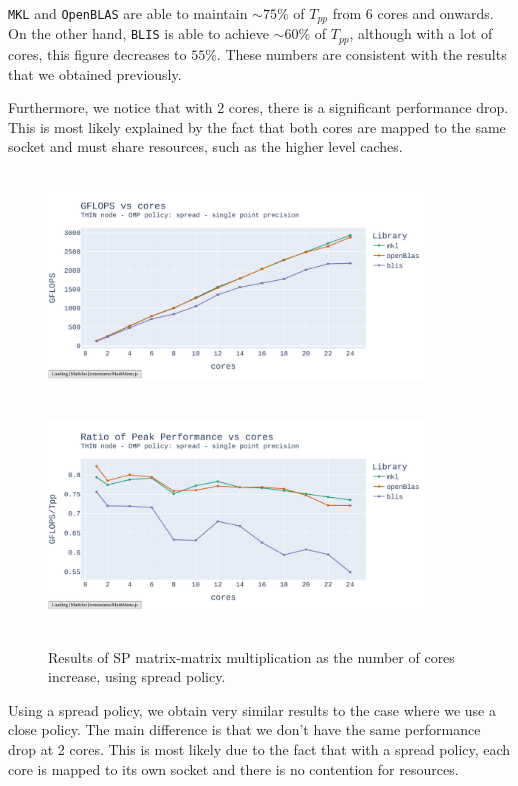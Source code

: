 \documentclass{report}
\begin{document}
\texttt{MKL} and \texttt{OpenBLAS} are able to maintain $\sim 75\%$
of $T_{pp}$ from $6$ cores and onwards. On the other hand, \texttt{BLIS}
is able to achieve $\sim 60\%$ of $T_{pp}$, although with a lot of cores, 
this figure decreases to $55\%$. These numbers are consistent with the results 
that we obtained previously. 

Furthermore, we notice that with $2$ cores, there is a significant performance 
drop. This is most likely explained by the fact that both cores are mapped to the 
same socket and must share resources, such as the higher level caches.

\begin{figure}[h!]
\hspace*{-2.5cm}
\includegraphics[width=10cm, height=6cm]{./images/fixed_size_thin_float_gflops_spread.pdf}
\includegraphics[width=10cm, height=6cm]{./images/fixed_size_thin_float_gflops_spread_ratio.pdf}
\caption{\label{fig:fixed_size_thin_float_spread} Results of SP matrix-matrix multiplication 
as the number of cores increase, using spread policy.}
\end{figure}

Using a spread policy, we obtain very similar results to the case where we use 
a close policy. The main difference is that we don't have the same performance 
drop at 2 cores. This is most likely due to the fact that with a spread policy, 
each core is mapped to its own socket and there is no contention for resources. 
\end{document}
